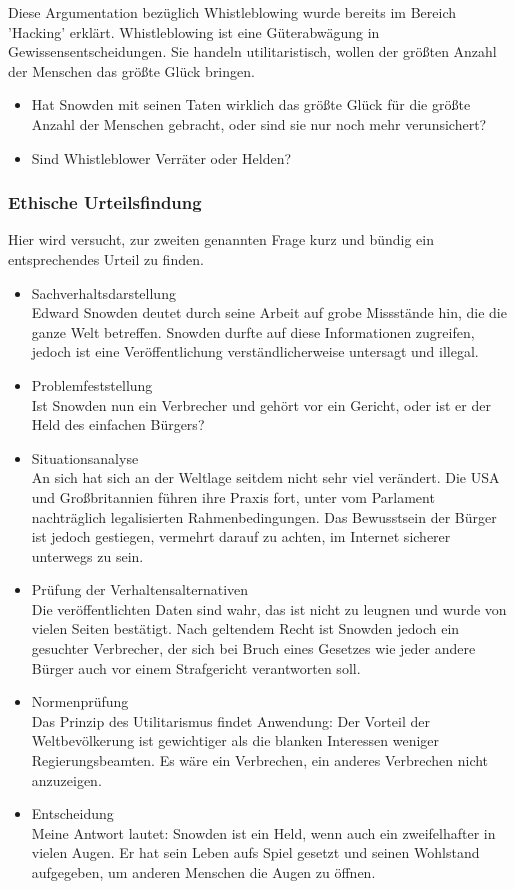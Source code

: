 \documentclass[letterpaper, 12pt]{article}
\let\tempsubsubsection\subsubsection
\renewcommand\subsubsection[1]{\vspace{0cm}\tempsubsubsection{#1}\vspace{0cm}}
\begin{document}
Diese Argumentation bezüglich Whistleblowing wurde bereits im Bereich 'Hacking' erklärt. Whistleblowing ist eine Güterabwägung in Gewissensentscheidungen. Sie handeln utilitaristisch, wollen der größten Anzahl der Menschen das größte Glück bringen.

\begin{itemize}
	\item Hat Snowden mit seinen Taten wirklich das größte Glück für die größte Anzahl der Menschen gebracht, oder sind sie nur noch mehr verunsichert?
	\item Sind Whistleblower Verräter oder Helden?
\end{itemize}

\subsubsection{Ethische Urteilsfindung}

Hier wird versucht, zur zweiten genannten Frage kurz und bündig ein entsprechendes Urteil zu finden.

\begin{itemize}
	\item Sachverhaltsdarstellung \\
	Edward Snowden deutet durch seine Arbeit auf grobe Missstände hin, die die ganze Welt betreffen. Snowden durfte auf diese Informationen zugreifen, jedoch ist eine Veröffentlichung verständlicherweise untersagt und illegal.
	\item Problemfeststellung \\
	Ist Snowden nun ein Verbrecher und gehört vor ein Gericht, oder ist er der Held des einfachen Bürgers?
	\item Situationsanalyse \\
	An sich hat sich an der Weltlage seitdem nicht sehr viel verändert. Die USA und Großbritannien führen ihre Praxis fort, unter vom Parlament nachträglich legalisierten Rahmenbedingungen. Das Bewusstsein der Bürger ist jedoch gestiegen, vermehrt darauf zu achten, im Internet sicherer unterwegs zu sein.
	\item Prüfung der Verhaltensalternativen \\
	Die veröffentlichten Daten sind wahr, das ist nicht zu leugnen und wurde von vielen Seiten bestätigt. Nach geltendem Recht ist Snowden jedoch ein gesuchter Verbrecher, der sich bei Bruch eines Gesetzes wie jeder andere Bürger auch vor einem Strafgericht verantworten soll.
	\item Normenprüfung \\
	Das Prinzip des Utilitarismus findet Anwendung: Der Vorteil der Weltbevölkerung ist gewichtiger als die blanken Interessen weniger Regierungsbeamten. Es wäre ein Verbrechen, ein anderes Verbrechen nicht anzuzeigen.
	\item Entscheidung \\
	Meine Antwort lautet: Snowden ist ein Held, wenn auch ein zweifelhafter in vielen Augen. Er hat sein Leben aufs Spiel gesetzt und seinen Wohlstand aufgegeben, um anderen Menschen die Augen zu öffnen. 
\end{itemize}
\end{document}
